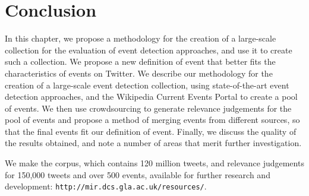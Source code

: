

\section{Conclusion}
\label{sec:conclusion}
\label{collection:sec:conclusion}
In this chapter, we propose a methodology for the creation of a large-scale collection for the evaluation of event detection approaches, and use it to create such a collection.
We propose a new definition of event that better fits the characteristics of events on Twitter.
We describe our methodology for the creation of a large-scale event detection collection, using state-of-the-art event detection approaches, and the Wikipedia Current Events Portal to create a pool of events.
We then use crowdsourcing to generate relevance judgements for the pool of events and propose a method of merging events from different sources, so that the final events fit our definition of event.
Finally, we discuss the quality of the results obtained, and note a number of areas that merit further investigation.

We make the corpus, which contains 120 million tweets, and relevance judgements for 150,000 tweets and over 500 events, available for further research and development: \texttt{http://mir.dcs.gla.ac.uk/resources/}.
